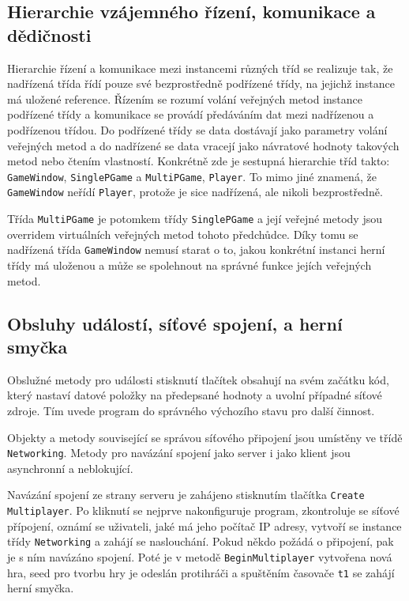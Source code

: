 \documentclass[12pt]{article}
\begin{document}
 \subsection*{Hierarchie vzájemného řízení, komunikace a dědičnosti}
 
 Hierarchie řízení a komunikace mezi instancemi různých tříd se realizuje tak, že nadřízená třída řídí pouze své bezprostředně podřízené třídy, na jejichž instance má uložené reference. Řízením se rozumí volání veřejných metod instance podřízené třídy a komunikace se provádí předáváním dat mezi nadřízenou a podřízenou třídou. Do podřízené třídy se data dostávají jako parametry volání veřejných metod a do nadřízené se data vracejí jako návratové hodnoty takových metod nebo čtením vlastností. Konkrétně zde je sestupná hierarchie tříd takto: \texttt{GameWindow}, \texttt{SinglePGame} a \texttt{MultiPGame}, \texttt{Player}. To mimo jiné znamená, že \texttt{GameWindow} neřídí \texttt{Player}, protože je sice nadřízená, ale nikoli bezprostředně.
 
 Třída \texttt{MultiPGame} je potomkem třídy \texttt{SinglePGame} a její veřejné metody jsou overridem virtuálních veřejných metod tohoto předchůdce. Díky tomu se nadřízená třída \texttt{GameWindow} nemusí starat o to, jakou konkrétní instanci herní třídy má uloženou a může se spolehnout na správné funkce jejích veřejných metod.
 
 \subsection*{Obsluhy událostí, síťové spojení, a herní smyčka}
 
 Obslužné metody pro události stisknutí tlačítek obsahují na svém začátku kód, který nastaví datové položky na předepsané hodnoty a uvolní případné síťové zdroje. Tím uvede program do správného výchozího stavu pro další činnost.
 
 Objekty a metody související se správou síťového připojení jsou umístěny ve třídě \texttt{Networking}. Metody pro navázání spojení jako server i jako klient jsou asynchronní a neblokující.
 
 Navázání spojení ze strany serveru je zahájeno stisknutím tlačítka \texttt{Create Multiplayer}. Po kliknutí se nejprve nakonfiguruje program, zkontroluje se síťové přípojení, oznámí se uživateli, jaké má jeho počítač IP adresy, vytvoří se instance třídy \texttt{Networking} a zahájí se naslouchání. Pokud někdo požádá o připojení, pak je s ním navázáno spojení. Poté je v metodě \texttt{BeginMultiplayer} vytvořena nová hra, seed pro tvorbu hry je odeslán protihráči a spuštěním časovače \texttt{t1} se zahájí herní smyčka.
 
\end{document}
